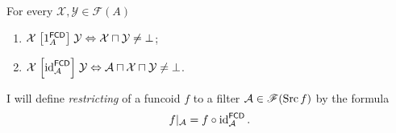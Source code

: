 \begin{obvious}
For every $\mathcal{X},\mathcal{Y}\in\mathscr{F}(A)$
\begin{enumerate}
\item
$\mathcal{X}\mathrel{\left[1_{A}^{\mathsf{FCD}}\right]}\mathcal{Y}\Leftrightarrow\mathcal{X}
\sqcap\mathcal{Y}\ne\bot$;
\item
$\mathcal{X}\mathrel{\left[\operatorname{id}_{\mathcal{A}}^{\mathsf{FCD}}\right]}\mathcal{Y}
\Leftrightarrow\mathcal{A}\sqcap\mathcal{X}\sqcap\mathcal{Y}\ne\bot$.
\end{enumerate}
\end{obvious}
\begin{defn}
I will define \emph{restricting} of a
funcoid $f$ to a filter $\mathcal{A}\in\mathscr{F}(\operatorname{Src} f)$ by the
formula
\[
f|_{\mathcal{A}}=f\circ\operatorname{id}_{\mathcal{A}}^{\mathsf{FCD}}.
\]

\end{defn}

